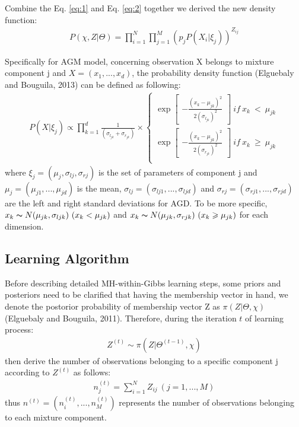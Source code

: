 \documentclass[conference]{llncs}
\begin{document}
Combine the Eq. \eqref{eq:1} and Eq. \eqref{eq:2} together we derived the new density function:
\begin{align}
P(\chi, Z|\Theta) = \prod_{i=1}^{N}\prod_{j=1}^{M}(p_jP(X_i|\xi_j))^{Z_{ij}}
\label{eq:3}
\end{align}

Specifically for AGM model, concerning observation X belongs to mixture component j and $X = (x_1,...,x_d)$, the probability density function (Elguebaly and Bouguila, 2013)\cite{b1} can be defined as following:
\begin{align}
P(X|\xi_j) \propto \prod_{k=1}^{d} \frac{1}{(\sigma_{l_{jk}}+\sigma_{r_{jk}})}
\times \left\{\begin{matrix}
\exp \begin{bmatrix}
-\frac{(x_k-\mu_{jk})^2}{2(\sigma_{l_{jk}})^2}
\end{bmatrix}\ if\ x_k\ <\ \mu_{jk} \\ 
\exp \begin{bmatrix}
-\frac{(x_k-\mu_{jk})^2}{2(\sigma_{r_{jk}})^2}
\end{bmatrix}\ if\ x_k\ \geqslant\ \mu_{jk} \\ 
\end{matrix}\right.
\label{eq:4}
\end{align}
where $\xi_j = (\mu_j,\sigma_{lj},\sigma_{rj})$ is the set of parameters of component j and $\mu_j = (\mu_{j1},...,\mu_{jd})$ is the mean, $\sigma_{lj} = (\sigma_{lj1},...,\sigma_{ljd})$ and $\sigma_{rj} = (\sigma_{rj1},...,\sigma_{rjd})$ are the left and right standard deviations for AGD. To be more specific, $x_k \thicksim N(\mu_{jk},\sigma_{ljk})\ (x_k < \mu_{jk})$ and $x_k \thicksim N(\mu_{jk},\sigma_{rjk})\ (x_k \geqslant \mu_{jk})$ for each dimension.

\subsection{Learning Algorithm}
Before describing detailed MH-within-Gibbs learning steps, some priors and posteriors need to be clarified that having the membership vector in hand,  we denote the postorior probability of membership vector Z as $\pi(Z|\Theta,\chi)$ (Elguebaly and Bouguila, 2011)\cite{b7}. Therefore, during the iteration $t$ of learning process:
\begin{align}
Z^{(t)} \sim \pi(Z|\Theta^{(t-1)},\chi)
\label{eq:5}
\end{align}
then derive the number of observations belonging to a specific component j according to $Z^{(t)}$ as follows:
\begin{align}
n_j^{(t)} = \sum_{i=1}^NZ_{ij}\ (j = 1,...,M) 
\label{eq:6}
\end{align}
thus $n^{(t)}=(n_i^{(t)},...,n_M^{(t)})$ represents the number of observations belonging to each mixture component.
\end{document}
